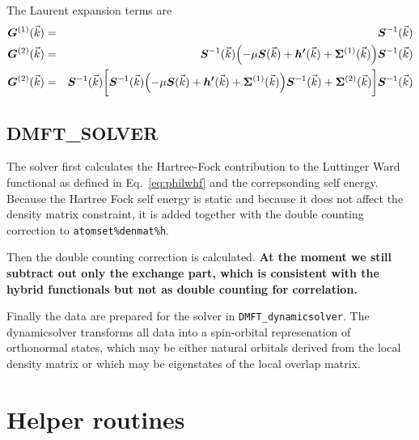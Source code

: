 \documentclass[11pt,a4paper]{report}
\newcommand{\mat}[1]{\bm{#1}}  %
\begin{document}
The Laurent expansion terms are
\begin{eqnarray}
\mat{G}^{(1)}(\vec{k})&=&\mat{S}^{-1}(\vec{k})
\nonumber\\
\mat{G}^{(2)}(\vec{k})&=&\mat{S}^{-1}(\vec{k})
\Bigl(-\mu\mat{S}(\vec{k})+\mat{h'}(\vec{k})+\mat{\Sigma}^{(1)}(\vec{k})
\Bigr)
\mat{S}^{-1}(\vec{k})
\nonumber\\
\mat{G}^{(2)}(\vec{k})&=&
\mat{S}^{-1}(\vec{k})
\biggl[
\mat{S}^{-1}(\vec{k})
\Bigl(-\mu\mat{S}(\vec{k})+\mat{h'}(\vec{k})+\mat{\Sigma}^{(1)}(\vec{k})
\Bigr)
\mat{S}^{-1}(\vec{k})+\mat{\Sigma}^{(2)}(\vec{k})
\biggr]
\mat{S}^{-1}(\vec{k})
\nonumber\\
\end{eqnarray}


\subsection{DMFT\_SOLVER}
The solver first calculates the Hartree-Fock contribution to the
Luttinger Ward functional as defined in Eq.~\ref{eq:philwhf} and the
correpsonding self energy. Because the Hartree Fock self energy is
static and because it does not affect the density matrix constraint,
it is added together with the double counting correction to
\verb|atomset%denmat%h|.


Then the double counting correction is calculated. \textbf{At the
  moment we still subtract out only the exchange part, which is
  consistent with the hybrid functionals but not as double counting
  for correlation.}

Finally the data are prepared for the solver in
\verb|DMFT_dynamicsolver|. The dynamicsolver transforms all data into
a spin-orbital represenation of orthonormal states, which may be
either natural orbitals derived from the local density matrix or which
may be eigenstates of the local overlap matrix.

\section{Helper routines}





\end{document}
